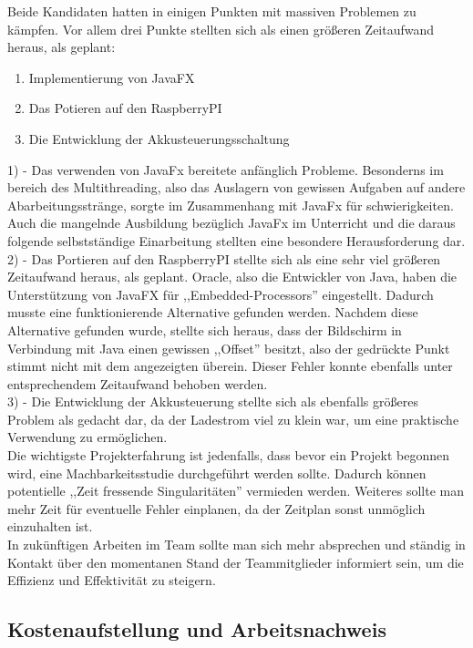 \documentclass[12pt,a4paper]{article}
\begin{document}
	Beide Kandidaten hatten in einigen Punkten mit massiven Problemen zu kämpfen. Vor allem drei Punkte stellten sich als einen größeren Zeitaufwand heraus, als geplant:
\begin{enumerate}
	\item{Implementierung von JavaFX}
	\item{Das Potieren auf den RaspberryPI}
	\item{Die Entwicklung der Akkusteuerungsschaltung}
\end{enumerate}
1) - Das verwenden von JavaFx bereitete anfänglich Probleme. Besonderns im bereich des Multithreading, also das Auslagern von gewissen Aufgaben auf andere Abarbeitungsstränge, sorgte im Zusammenhang mit JavaFx für schwierigkeiten. Auch die mangelnde Ausbildung bezüglich JavaFx im Unterricht und die daraus folgende selbstständige Einarbeitung stellten eine besondere Herausforderung dar.  \\[1ex]
2) - Das Portieren auf den RaspberryPI stellte sich als eine sehr viel größeren Zeitaufwand heraus, als geplant. Oracle, also die Entwickler von Java, haben die Unterstützung von JavaFX für ,,Embedded-Processors'' eingestellt. Dadurch musste eine funktionierende Alternative gefunden werden. Nachdem diese Alternative gefunden wurde, stellte sich heraus, dass der Bildschirm in Verbindung mit Java einen gewissen ,,Offset'' besitzt, also der gedrückte Punkt stimmt nicht mit dem angezeigten überein. Dieser Fehler konnte ebenfalls unter entsprechendem Zeitaufwand behoben werden. \\[1ex]
3) - Die Entwicklung der Akkusteuerung stellte sich als ebenfalls größeres Problem als gedacht dar, da der Ladestrom viel zu klein war, um eine praktische Verwendung zu ermöglichen. \\[2ex]
Die wichtigste Projekterfahrung ist jedenfalls, dass bevor ein Projekt begonnen wird, eine Machbarkeitsstudie durchgeführt werden sollte. Dadurch können potentielle ,,Zeit fressende Singularitäten'' vermieden werden. Weiteres sollte man mehr Zeit für eventuelle Fehler einplanen, da der Zeitplan sonst unmöglich einzuhalten ist. \\
In zukünftigen Arbeiten im Team sollte man sich mehr absprechen und ständig in Kontakt über den momentanen Stand der Teammitglieder informiert sein, um die Effizienz und Effektivität zu steigern.

 \subsection{Kostenaufstellung und Arbeitsnachweis} 
\end{document}
